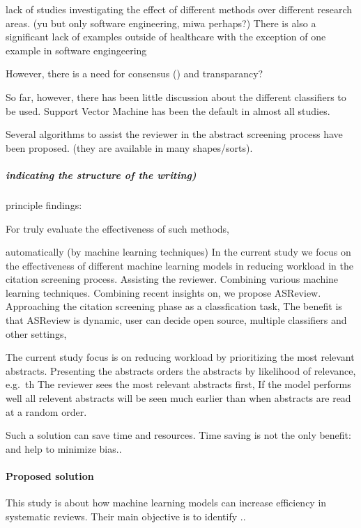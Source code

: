 \documentclass[
]{article}
\begin{document}
lack of studies investigating the effect of different methods over
different research areas. (yu but only software engineering, miwa
perhaps?) There is also a significant lack of examples outside of
healthcare with the exception of one example in software engingeering

However, there is a need for consensus () and transparancy?

So far, however, there has been little discussion about the different
classifiers to be used. Support Vector Machine has been the default in
almost all studies.

Several algorithms to assist the reviewer in the abstract screening
process have been proposed. (they are available in many shapes/sorts).

\hypertarget{indicating-the-structure-of-the-writing}{%
\subparagraph{indicating the structure of the
writing)}\label{indicating-the-structure-of-the-writing}}

principle findings:

For truly evaluate the effectiveness of such methods,

automatically (by machine learning techniques) In the current study we
focus on the effectiveness of different machine learning models in
reducing workload in the citation screening process. Assisting the
reviewer. Combining various machine learning techniques. Combining
recent insights on, we propose ASReview. Approaching the citation
screening phase as a classfication task, The benefit is that ASReview is
dynamic, user can decide open source, multiple classifiers and other
settings,

The current study focus is on reducing workload by prioritizing the most
relevant abstracts. Presenting the abstracts orders the abstracts by
likelihood of relevance, e.g.~th The reviewer sees the most relevant
abstracts first, If the model performs well all relevent abstracts will
be seen much earlier than when abstracts are read at a random order.

Such a solution can save time and resources. Time saving is not the only
benefit: and help to minimize bias..

\hypertarget{proposed-solution}{%
\paragraph{Proposed solution}\label{proposed-solution}}

This study is about how machine learning models can increase efficiency
in systematic reviews. Their main objective is to identify ..
\end{document}
